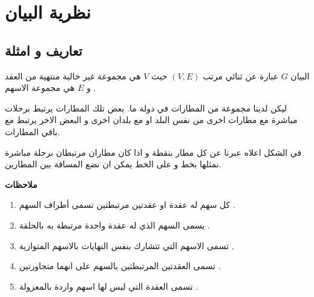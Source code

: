 \chapter{نظرية  البيان}

\section{تعاريف و امثلة}

\begin{definition}
	البيان $G$ عبارة عن ثنائي مرتب $(V,E)$ حيث $V$ هي مجموعة غير خالية منتهية من العقد  و $E$ هي مجموعة الاسهم .
\end{definition}

\begin{example}
	ليكن لدينا مجموعة من المطارات في دولة ما. بعض تلك المطارات يرتبط برحلات مباشرة مع مطارات اخرى من نفس البلد او مع بلدان اخرى و البعض الاخر يرتبط مع باقي المطارات.
	
\begin{figure}[H]
	\centering
\end{figure}
	
	في الشكل اعلاه عبرنا عن كل مطار بنقطة و اذا كان مطاران مرتبطان برحلة مباشرة نمثلها بخط و على الخط يمكن ان نضع المسافة بين المطارين.
\end{example}

\noindent
\textbf{ملاحظات}
\begin{enumerate}
	\item كل سهم له عقدة او عقدتين مرتبطتين تسمى أطراف السهم .
	\item يسمى السهم الذي له عقدة واحدة مرتبطة به بالحلقة .
	\item تسمى الاسهم التي تتشارك بنفس النهايات بالاسهم المتوازية .
	\item تسمى العقدتين المرتبطتين بالسهم على انهما متجاورتين .
	\item  تسمى العقدة التي ليس لها اسهم واردة بالمعزولة .
\end{enumerate}

